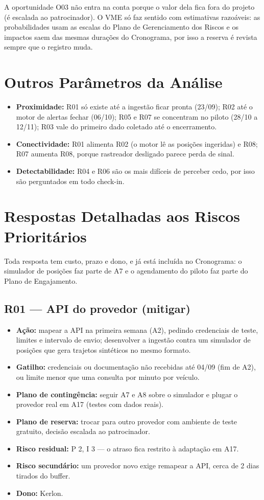 \documentclass[11pt,a4paper]{article}
\begin{document}
\noindent A oportunidade O03 não entra na conta porque o valor dela fica fora do projeto (é escalada ao patrocinador). O VME só faz sentido com estimativas razoáveis: as probabilidades usam as escalas do Plano de Gerenciamento dos Riscos e os impactos saem das mesmas durações do Cronograma, por isso a reserva é revista sempre que o registro muda.

\section{Outros Parâmetros da Análise}
\begin{itemize}[itemsep=2pt]
  \item \textbf{Proximidade:} R01 só existe até a ingestão ficar pronta (23/09); R02 até o motor de alertas fechar (06/10); R05 e R07 se concentram no piloto (28/10 a 12/11); R03 vale do primeiro dado coletado até o encerramento.
  \item \textbf{Conectividade:} R01 alimenta R02 (o motor lê as posições ingeridas) e R08; R07 aumenta R08, porque rastreador desligado parece perda de sinal.
  \item \textbf{Detectabilidade:} R04 e R06 são os mais difíceis de perceber cedo, por isso são perguntados em todo check-in.
\end{itemize}

\section{Respostas Detalhadas aos Riscos Prioritários}
Toda resposta tem custo, prazo e dono, e já está incluída no Cronograma: o simulador de posições faz parte de A7 e o agendamento do piloto faz parte do Plano de Engajamento.

\subsection*{R01 --- API do provedor (mitigar)}
\begin{itemize}[itemsep=2pt]
  \item \textbf{Ação:} mapear a API na primeira semana (A2), pedindo credenciais de teste, limites e intervalo de envio; desenvolver a ingestão contra um simulador de posições que gera trajetos sintéticos no mesmo formato.
  \item \textbf{Gatilho:} credenciais ou documentação não recebidas até 04/09 (fim de A2), ou limite menor que uma consulta por minuto por veículo.
  \item \textbf{Plano de contingência:} seguir A7 e A8 sobre o simulador e plugar o provedor real em A17 (testes com dados reais).
  \item \textbf{Plano de reserva:} trocar para outro provedor com ambiente de teste gratuito, decisão escalada ao patrocinador.
  \item \textbf{Risco residual:} P 2, I 3 --- o atraso fica restrito à adaptação em A17.
  \item \textbf{Risco secundário:} um provedor novo exige remapear a API, cerca de 2 dias tirados do buffer.
  \item \textbf{Dono:} Kerlon.
\end{itemize}
\end{document}
